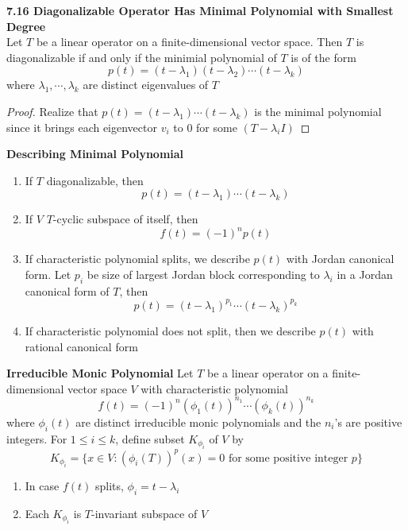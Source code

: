 \documentclass[11pt]{article}
\begin{document}
\begin{theorem*}
    \textbf{7.16 Diagonalizable Operator Has Minimal Polynomial with Smallest Degree} \\
    Let $T$ be a linear operator on a finite-dimensional vector space. Then $T$ is diagonalizable if and only if the minimial polynomial of $T$ is of the form 
    \[
        p(t) = (t-\lambda_1) (t-\lambda_2) \cdots (t-\lambda_k)    
    \] 
    where $\lambda_1 , \cdots, \lambda_k$ are distinct eigenvalues of $T$
    \begin{proof}
        Realize that $p(t) = (t-\lambda_1) \cdots (t-\lambda_k)$ is the minimal polynomial since it brings each eigenvector $v_i$ to 0 for some $(T-\lambda_i I)$
    \end{proof}
\end{theorem*}

\begin{defn*}
    \textbf{Describing Minimal Polynomial}
    \begin{enumerate}
        \item If $T$ diagonalizable, then 
        \[
            p(t) = (t-\lambda_1) \cdots (t-\lambda_k)
        \]
        \item If $V$ $T$-cyclic subspace of itself, then 
        \[
            f(t) = (-1)^n p(t)    
        \]
        \item If characteristic polynomial splits, we describe $p(t)$ with Jordan canonical form. Let $p_i$ be size of largest Jordan block corresponding to $\lambda_i$ in a Jordan canonical form of $T$, then
        \[
            p(t) = (t-\lambda_1)^{p_1}  \cdots (t-\lambda_k)^{p_k}   
        \]
        \item If characteristic polynomial does not split, then we describe $p(t)$ with rational canonical form
    \end{enumerate}
\end{defn*}



\begin{defn*}
    \textbf{Irreducible Monic Polynomial} Let $T$ be a linear operator on a finite-dimensional vector space $V$ with characteristic polynomial 
    \[
        f(t) = (-1)^n (\phi_1(t))^{n_1} \cdots (\phi_k(t))^{n_k}  
    \]
    where $\phi_i(t)$ are distinct irreducible monic polynomials and the $n_i$'s are positive integers. For $1\leq i \leq k$, define subset $K_{\phi_i}$ of $V$ by 
    \[
        K_{\phi_i} = \{x\in V: (\phi_i(T))^p(x) = 0 \text{  for some positive integer } p\}    
    \]
    \begin{enumerate}
        \item In case $f(t)$ splits, $\phi_i = t-\lambda_i$
        \item Each $K_{\phi_i}$ is $T$-invariant subspace of $V$ 
    \end{enumerate}
\end{defn*}
\end{document}
